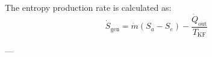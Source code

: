 The entropy production rate is calculated as:  
\[
\dot{S}_{\text{gen}} = \dot{m}(S_a - S_e) - \frac{\dot{Q}_{\text{out}}}{T_{\text{KF}}}
\]  

---